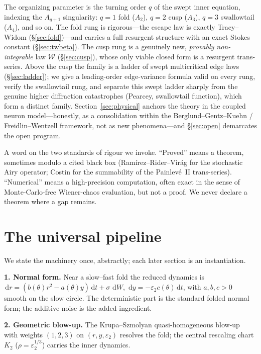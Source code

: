 \documentclass[11pt,reqno]{amsart}
\theoremstyle{plain}
\theoremstyle{definition}
\theoremstyle{remark}
\newcommand{\dd}{\,\mathrm{d}}
\newcommand{\W}{\mathcal{W}}
\newcommand{\eps}{\varepsilon}
\begin{document}
The organizing parameter is the turning order $q$ of the swept inner equation, indexing the
$A_{q+1}$ singularity: $q{=}1$ fold ($A_2$), $q{=}2$ cusp ($A_3$), $q{=}3$ swallowtail ($A_4$),
and so on. The fold rung is rigorous---the escape law is exactly Tracy--Widom
(\S\ref{sec:fold})---and carries a full resurgent structure with an exact Stokes constant
(\S\ref{sec:twbeta}). The cusp rung is a genuinely new, \emph{provably non-integrable} law $\W$
(\S\ref{sec:cusp}), whose only viable closed form is a resurgent trans-series. Above the cusp the
family is a ladder of swept multicritical edge laws (\S\ref{sec:ladder}); we give a leading-order
edge-variance formula valid on every rung, verify the swallowtail rung, and separate this swept
ladder sharply from the genuine higher diffraction catastrophes (Pearcey, swallowtail function),
which form a distinct family. Section~\ref{sec:physical} anchors the theory in the coupled
neuron model---honestly, as a consolidation within the Berglund--Gentz--Kuehn / Freidlin--Wentzell
framework, not as new phenomena---and \S\ref{sec:open} demarcates the open program.

A word on the two standards of rigour we invoke. ``Proved'' means a theorem, sometimes modulo a
cited black box (Ram\'irez--Rider--Vir\'ag for the stochastic Airy operator; Costin for the
summability of the Painlev\'e~II trans-series). ``Numerical'' means a high-precision computation,
often exact in the sense of Monte-Carlo-free Wiener-chaos evaluation, but not a proof. We never
declare a theorem where a gap remains.

\section{The universal pipeline}\label{sec:pipeline}

We state the machinery once, abstractly; each later section is an instantiation.

\smallskip
\noindent\textbf{1. Normal form.} Near a slow--fast fold the reduced dynamics is
$\dd r=(b(\theta)r^2-a(\theta)y)\dd t+\sigma\,\dd W$, $\dd y=-\eps_2 c(\theta)\dd t$, with
$a,b,c>0$ smooth on the slow circle. The deterministic part is the standard folded normal form;
the additive noise is the added ingredient.

\smallskip
\noindent\textbf{2. Geometric blow-up.} The Krupa--Szmolyan quasi-homogeneous blow-up~\cite{KS,JKK}
with weights $(1,2,3)$ on $(r,y,\eps_2)$ resolves the fold; the central rescaling chart $K_2$
($\rho=\eps_2^{1/3}$) carries the inner dynamics.
\end{document}
